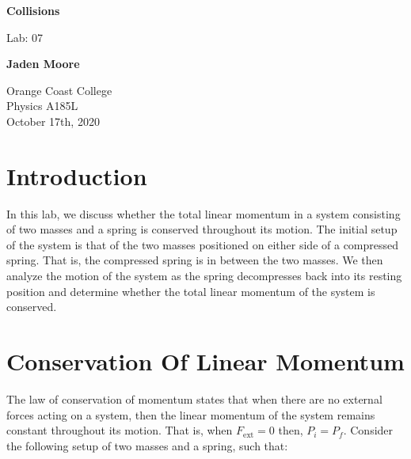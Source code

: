 \documentclass[12pt]{article}
\begin{document}

\begin{titlepage}
    \begin{center}
        \vspace*{1cm}
        \textbf{Collisions}

        \vspace{0.5cm}
        Lab: 07

        \vspace{1cm}

        \textbf{Jaden Moore}

        \vfill

        Orange Coast College\\
        Physics A185L\\
        October 17th, 2020

    \end{center}
\end{titlepage}

\pagestyle{fancy}
\fancyhf{}
\setlength{\headheight}{15pt}
\cfoot{\thepage}

\section{Introduction}
In this lab, we discuss whether the total linear momentum in a system consisting of two masses and a spring is conserved throughout its motion. The initial setup of the system is that of the two masses positioned on either side of a compressed spring. That is, the compressed spring is in between the two masses. We then analyze the motion of the system as the spring decompresses back into its resting position and determine whether the total linear momentum of the system is conserved.

\section{Conservation Of Linear Momentum}
The law of conservation of momentum states that when there are no external forces acting on a system, then the linear momentum of the system remains constant throughout its motion. That is, when $F_\text{ext} = 0$ then, $P_i = P_f$. Consider the following setup of two masses and a spring, such that:
\end{document}
